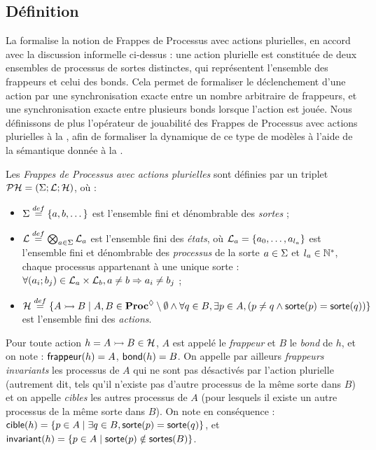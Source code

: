 \subsection{Définition}

La  formalise la notion de Frappes de Processus avec actions plurielles,
en accord avec la discussion informelle ci-dessus :
une action plurielle est constituée de deux ensembles de processus de sortes distinctes,
qui représentent l'ensemble des frappeurs et celui des bonds.
Cela permet de formaliser le déclenchement d'une action par une synchronisation exacte
entre un nombre arbitraire de frappeurs,
et une synchronisation exacte entre plusieurs bonds lorsque l'action est jouée.
Nous définissons de plus l'opérateur de jouabilité
des Frappes de Processus avec actions plurielles
à la ,
afin de formaliser la dynamique de ce type de modèles
à l'aide de la sémantique donnée à la .

\begin{definition}
  Les \emph{Frappes de Processus avec actions plurielles} sont définies
  par un triplet $\mathcal{PH} = (\Sigma; \mathcal{L}; \mathcal{H})$, où :
  \begin{itemize}
    \item $\Sigma \stackrel{def}= \{a, b, \dots\}$ est l'ensemble fini et dénombrable des \emph{sortes} ;
    \item $\mathcal{L} \stackrel{def}= \bigotimes_{a \in \Sigma} \mathcal{L}_a$ est l'ensemble fini des \emph{états},
      où $\mathcal{L}_a = \{a_0, \ldots, a_{l_a}\}$ est l'ensemble fini et dénombrable
      des \emph{processus} de la sorte $a \in \Sigma$ et $l_a \in \mathbb{N}^*$,
      chaque processus appartenant à une unique sorte :
      $\forall (a_i; b_j) \in \mathcal{L}_a \times \mathcal{L}_b, a \neq b \Rightarrow a_i \neq b_j$ ;
    \item $\mathcal{H} \stackrel{def}= \{\mbox{$A \rightarrowtail B$} \mid A, B \in \mathbf{Proc}^{\lozenge} \setminus \emptyset \wedge
      \forall q \in B, \exists p \in A, (p \neq q \wedge \mathsf{sorte}(p) = \mathsf{sorte}(q)) \}$
      est l'ensemble fini des \emph{actions}.
  \end{itemize}
\end{definition}
%
\noindent
Pour toute action $h = \mbox{$A \rightarrowtail B$} \in \mathcal{H}$,
$A$ est appelé le \emph{frappeur} et $B$ le \emph{bond} de $h$,
et on note : $\mathsf{frappeur}(h) = A$, $\mathsf{bond}(h) = B$.
On appelle par ailleurs \emph{frappeurs invariants} les processus de $A$
qui ne sont pas désactivés par l'action plurielle
(autrement dit, tels qu'il n'existe pas d'autre processus de la même sorte dans $B$)
et on appelle \emph{cibles} les autres processus de $A$
(pour lesquels il existe un autre processus de la même sorte dans $B$).
On note en conséquence :
$\mathsf{cible}(h) = \{ p \in A \mid \exists q \in B, \mathsf{sorte}(p) = \mathsf{sorte}(q) \}$,
et $\mathsf{invariant}(h) = \{ p \in A \mid \mathsf{sorte}(p) \notin \mathsf{sortes}(B) \}$.

